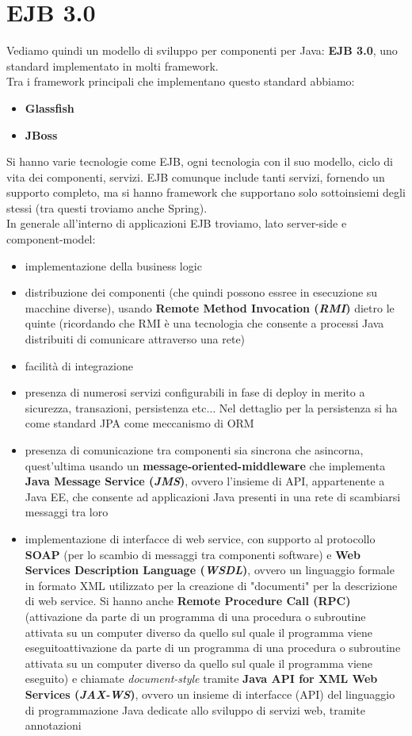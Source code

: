\documentclass[a4paper,12pt, oneside]{book}
\begin{document}
\section{EJB 3.0}
Vediamo quindi un modello di sviluppo per componenti per Java: \textbf{EJB
  3.0}, uno standard implementato in molti framework.\\
Tra i framework principali che implementano questo standard abbiamo:
\begin{itemize}
  \item \textbf{Glassfish}
  \item \textbf{JBoss}
\end{itemize}
Si hanno varie tecnologie come EJB, ogni tecnologia con il suo modello,
ciclo di vita dei componenti, servizi.
EJB comunque include tanti servizi, fornendo un supporto completo, ma si hanno
framework 
che supportano solo sottoinsiemi degli stessi (tra questi troviamo anche
Spring).\\ 
In generale all'interno di applicazioni EJB troviamo, lato server-side e
component-model:
\begin{itemize}
  \item implementazione della business logic
  \item distribuzione dei componenti (che quindi possono essree in esecuzione su
  macchine diverse), usando \textbf{Remote Method Invocation (\textit{RMI})}
  dietro le quinte (ricordando che RMI è una tecnologia che consente a processi
  Java distribuiti di comunicare attraverso una rete) 
  \item facilità di integrazione
  \item presenza di numerosi servizi configurabili in fase di deploy in merito a
  sicurezza, transazioni, persistenza etc$\ldots$ Nel dettaglio per la
  persistenza si ha come standard JPA come meccanismo di ORM
  \item presenza di comunicazione tra componenti sia sincrona che asincorna,
  quest'ultima usando un \textbf{message-oriented-middleware} che implementa
  \textbf{Java Message Service (\textit{JMS})}, ovvero l'insieme di API,
  appartenente a Java EE, che consente ad applicazioni Java presenti in una rete
  di scambiarsi messaggi tra loro
  \item implementazione di interfacce di web service, con supporto al protocollo
  \textbf{SOAP} (per lo scambio di messaggi tra componenti software) e \textbf{
    Web Services Description Language (\textit{WSDL})}, ovvero un linguaggio
  formale in formato XML utilizzato per la creazione di "documenti" per la
  descrizione di web service. Si hanno anche \textbf{Remote Procedure Call
    (RPC)} (attivazione da parte di un programma di una procedura o subroutine
  attivata su un computer diverso da quello sul quale il programma viene
  eseguitoattivazione da parte di un programma di una procedura o subroutine
  attivata su un computer diverso da quello sul quale il programma viene
  eseguito) e chiamate \textit{document-style} tramite \textbf{Java API for XML
    Web Services (\textit{JAX-WS})}, ovvero un insieme di interfacce (API) del
  linguaggio di programmazione Java dedicate allo sviluppo di servizi web,
  tramite annotazioni
\end{itemize}
\end{document}

